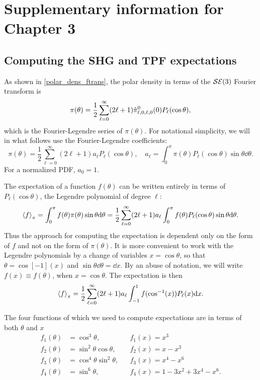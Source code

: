 \documentclass[../../main.tex]{subfiles}
\begin{document}
\chapter{Supplementary information for Chapter 3}
\label{shg-tpf-si}

\begin{refsection}

	\section{Computing the SHG and TPF expectations}

	As shown in \cref{polar_dens_ftrans}, the polar density in terms of the $\mathcal{SE} (3)$ Fourier transform is
	$$\pi(\theta) = \frac{1}{2} \sum_{\ell=0}^\infty (2\ell+1) \hat{\pi}^0_{\ell,0,\ell,0}(0) P_\ell(\cos\theta),$$
	which is the Fourier-Legendre series of $\pi(\theta)$.
	For notational simplicity, we will in what follows use the Fourier-Legendre coefficients:
	$$\pi(\theta) = \frac{1}{2} \sum_{\ell=0}^\infty (2\ell+1) a_\ell P_\ell(\cos\theta), \quad a_\ell = \int_0^\pi \pi(\theta) P_\ell(\cos\theta) \sin\theta \dd\theta.$$
	For a normalized PDF, $a_0 = 1$.

	The expectation of a function $f(\theta)$ can be written entirely in terms of $P_\ell(\cos\theta)$, the Legendre polynomial of degree $\ell$:
	$$\left\langle f \right\rangle_{\pi} = \int_0^\pi f(\theta) \pi(\theta) \sin\theta \dd\theta = \frac{1}{2} \sum_{\ell=0}^\infty (2\ell+1) a_\ell \int_0^\pi f(\theta) P_\ell(\cos\theta) \sin\theta \dd\theta.$$
	Thus the approach for computing the expectation is dependent only on the form of $f$ and not on the form of $\pi(\theta)$.
	It is more convenient to work with the Legendre polynomials by a change of variables $x = \cos\theta$, so that $\theta = \cos[-1](x)$ and $\sin\theta \dd\theta = \dd x$.
	By an abuse of notation, we will write $f(x) \equiv f(\theta)$, when $x=\cos\theta$.
	The expectation is then
	$$\left\langle f \right\rangle_{\pi} = \frac{1}{2} \sum_{\ell=0}^\infty (2\ell+1) a_\ell \int_{-1}^1 f(\cos[-1](x)) P_\ell(x) \dd x.$$

	The four functions of which we need to compute expectations are in terms of both $\theta$ and $x$
	\begin{align*}
		f_1(\theta) & = \cos^3 \theta,             &  & f_1(x) = x^3                      \\
		f_2(\theta) & = \sin^2\theta \cos\theta,   &  & f_2(x) = x - x^3                  \\
		f_3(\theta) & = \cos^4\theta \sin^2\theta, &  & f_3(x) = x^4 - x^6                \\
		f_4(\theta) & = \sin^6\theta,              &  & f_4(x) = 1 - 3 x^2 + 3 x^4 - x^6.
	\end{align*}


\end{refsection}
\end{document}
